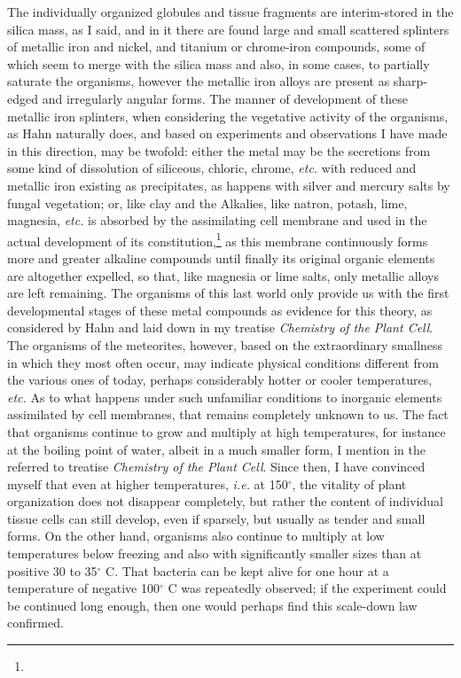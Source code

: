 \documentclass[a4paper, 12pt, oneside]{article}
\begin{document}
The individually organized globules and tissue fragments are interim-stored in the silica mass, as I said, and in it there are found large and small scattered splinters of metallic iron and nickel, and titanium or chrome-iron compounds, some of which seem to merge with the silica mass and also, in some cases, to partially saturate the organisms, however the metallic iron alloys are present as sharp-edged and irregularly angular forms. The manner of development of these metallic iron splinters, when considering the vegetative activity of the organisms, as Hahn naturally does, and based on experiments and observations I have made in this direction, may be twofold: either the metal may be the secretions from some kind of dissolution of siliceous, chloric, chrome, \emph{etc.} with reduced and metallic iron existing as precipitates, as happens with silver and mercury salts by fungal vegetation; or, like clay and the Alkalies, like natron, potash, lime, magnesia, \emph{etc.} is absorbed by the assimilating cell membrane and used in the actual development of its constitution,\footnote{} as this membrane continuously forms more and greater alkaline compounds until finally its original organic elements are altogether expelled, so that, like magnesia or lime salts, only metallic alloys are left remaining. The organisms of this last world only provide us with the first developmental stages of these metal compounds as evidence for this theory, as considered by Hahn and laid down in my treatise \emph{Chemistry of the Plant Cell}. The organisms of the meteorites, however, based on the extraordinary smallness in which they most often occur, may indicate physical conditions different from the various ones of today, perhaps considerably hotter or cooler temperatures, \emph{etc.} As to what happens under such unfamiliar conditions to inorganic elements assimilated by cell membranes, that remains completely unknown to us. The fact that organisms continue to grow and multiply at high temperatures, for instance at the boiling point of water, albeit in a much smaller form, I mention in the referred to treatise \emph{Chemistry of the Plant Cell}. Since then, I have convinced myself that even at higher temperatures, \emph{i.e.} at 150$^{\circ}$, the vitality of plant organization does not disappear completely, but rather the content of individual tissue cells can still develop, even if sparsely, but usually as tender and small forms. On the other hand, organisms also continue to multiply at low temperatures below freezing and also with significantly smaller sizes than at positive 30 to 35$^{\circ}$ C. That bacteria can be kept alive for one hour at a temperature of negative 100$^{\circ}$ C was repeatedly observed; if the experiment could be continued long enough, then one would perhaps find this scale-down law confirmed.
\end{document}
